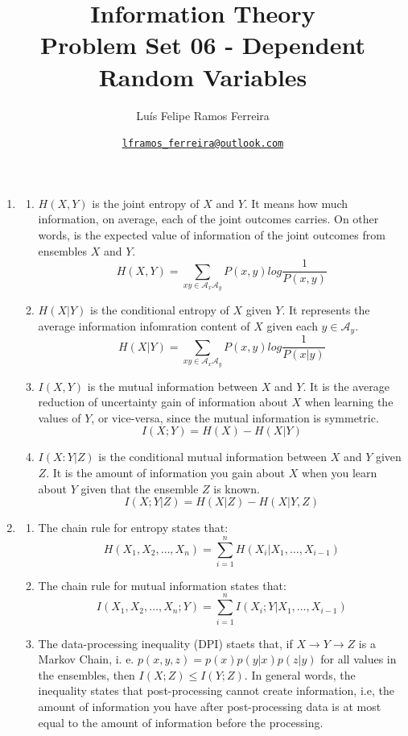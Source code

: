 \documentclass{article}
\title{Information Theory \\ \large Problem Set 06 - Dependent Random Variables}
\author{Luís Felipe Ramos Ferreira}
\date{\href{mailto:lframos\_ferreira@outlook.com}{\texttt{lframos\_ferreira@outlook.com}}
}
\begin{document}
\maketitle

\begin{enumerate}
	\item \begin{enumerate}
		      \item \(H(X, Y)\) is the joint entropy of \(X\) and \(Y\). It means how much information, on average, each of the joint outcomes carries. On other words, is the expected value of information of the joint outcomes from ensembles \(X\) and \(Y\).
		            \[H(X, Y) = \sum_{xy \in \mathcal{A}_x\mathcal{A}_y} P(x, y) log \frac{1}{P(x, y)}\]
		      \item \(H(X | Y)\) is the conditional entropy of \(X\) given \(Y\). It represents the average information infomration content of \(X\) given each \(y \in \mathcal{A}_y\).
		            \[H(X | Y) = \sum_{xy \in \mathcal{A}_x\mathcal{A}_y} P(x, y) log \frac{1}{P(x | y)}\]
		      \item \(I(X, Y)\) is the mutual information between \(X\) and \(Y\). It is the average reduction of uncertainty gain of information about \(X\) when learning the values of \(Y\), or vice-versa, since the mutual information is symmetric.
		            \[I(X; Y) = H(X) - H(X | Y) \]
		      \item \(I(X: Y | Z)\) is the conditional mutual information between \(X\) and \(Y\) given \(Z\). It is the amount of information you gain about \(X\) when you learn about \(Y\) given that the ensemble \(Z\) is known.
		            \[I(X; Y | Z) = H(X | Z) - H(X | Y, Z)\]
	      \end{enumerate}

	\item \begin{enumerate}
		      \item The chain rule for entropy states that:
		            \[H(X_1, X_2, \dots, X_n) = \sum_{i=1}^{n} H(X_i | X_1, \dots, X_{i-1})\]
		      \item The chain rule for mutual information states that:
		            \[I(X_1, X_2, \dots, X_n; Y) = \sum_{i=1}^{n} I(X_i; Y | X_1, \dots, X_{i-1})\]
		      \item The data-processing inequality (DPI) staets that, if \(X \rightarrow Y \rightarrow Z\) is a Markov Chain, i. e. \(p(x, y, z) = p(x) p(y | x) p(z | y)\) for all values in the ensembles, then \(I(X;Z) \leq I(Y;Z)\).
		            In general words, the inequality states that post-processing cannot create information, i.e, the amount of information you have after post-processing data is at most equal to the amount of information before the processing.
	      \end{enumerate}


\end{enumerate}
\end{document}
